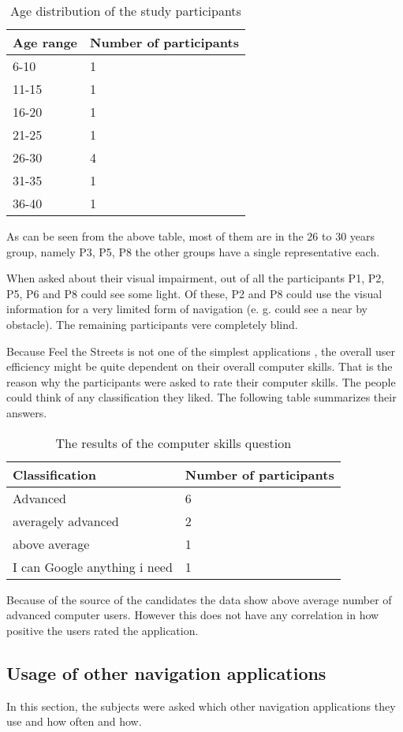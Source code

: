 \documentclass[nolof,digital]{fithesis3}
\begin{document}
\begin{table}
\caption{Age distribution of the study participants}
\begin{tabularx}{\textwidth}{ |X|X| }
Age range & Number of participants \\
\hline
6-10 & 1 \\
11-15 & 1 \\
16-20 & 1 \\
21-25  & 1 \\
26-30 & 4 \\
31-35 & 1 \\
36-40 & 1 \\
\end{tabularx}
\end{table}
As can be seen from the above table, most of them are in the 26 to 30 years group, namely P3, P5, P8 the other groups have a single representative each.

When asked about their visual impairment, out of all the participants P1, P2, P5, P6 and P8 could see some light. Of these, P2 and P8 could use the visual information for a very limited form of navigation (e. g. could see a near by obstacle). The remaining participants vere completely blind.

Because Feel the Streets is not one of the simplest applications , the overall user efficiency might be quite dependent on their overall computer skills. That is the reason why the participants were asked to rate their computer skills. The people could think of any classification they liked. The following table summarizes their answers.
\begin{table}
\caption{The results of the computer skills question}
\begin{tabularx}{\textwidth}{ |X|X| }
Classification & Number of participants \\
\hline
Advanced & 6 \\
averagely advanced & 2 \\
above average & 1 \\
I can Google anything i need & 1 \\
\end{tabularx}
\end{table}
Because of the source of the candidates the data show above average number of advanced computer users. However this does not have any correlation in how positive the users rated the application.
\subsection{Usage of other navigation applications}
In this section, the subjects were asked which other navigation applications they use and how often and how.
\end{document}
